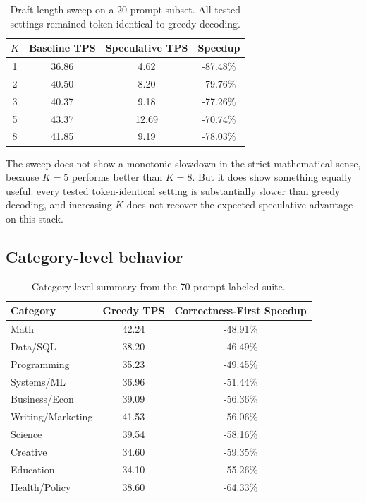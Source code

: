 \documentclass[11pt]{article}
\begin{document}
\begin{table}[h]
\centering
\begin{tabular}{@{}cccc@{}}
\toprule
\textbf{$K$} & \textbf{Baseline TPS} & \textbf{Speculative TPS} & \textbf{Speedup} \\
\midrule
1 & 36.86 & 4.62 & -87.48\% \\
2 & 40.50 & 8.20 & -79.76\% \\
3 & 40.37 & 9.18 & -77.26\% \\
5 & 43.37 & 12.69 & -70.74\% \\
8 & 41.85 & 9.19 & -78.03\% \\
\bottomrule
\end{tabular}
\caption{Draft-length sweep on a 20-prompt subset. All tested settings remained token-identical to greedy decoding.}
\label{tab:ksweep}
\end{table}

The sweep does not show a monotonic slowdown in the strict mathematical sense, because $K=5$ performs better than $K=8$. But it does show something equally useful: every tested token-identical setting is substantially slower than greedy decoding, and increasing $K$ does not recover the expected speculative advantage on this stack.

\subsection{Category-level behavior}

\begin{table}[h]
\centering
\begin{tabular}{@{}lcc@{}}
\toprule
\textbf{Category} & \textbf{Greedy TPS} & \textbf{Correctness-First Speedup} \\
\midrule
Math & 42.24 & -48.91\% \\
Data/SQL & 38.20 & -46.49\% \\
Programming & 35.23 & -49.45\% \\
Systems/ML & 36.96 & -51.44\% \\
Business/Econ & 39.09 & -56.36\% \\
Writing/Marketing & 41.53 & -56.06\% \\
Science & 39.54 & -58.16\% \\
Creative & 34.60 & -59.35\% \\
Education & 34.10 & -55.26\% \\
Health/Policy & 38.60 & -64.33\% \\
\bottomrule
\end{tabular}
\caption{Category-level summary from the 70-prompt labeled suite.}
\label{tab:category}
\end{table}
\end{document}
